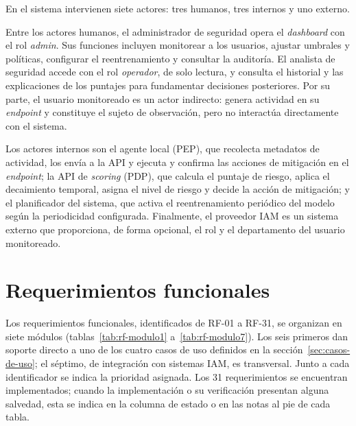 En el sistema intervienen siete actores: tres humanos, tres internos y uno externo.

Entre los actores humanos, el administrador de seguridad opera el \emph{dashboard} con el rol \textit{admin}. Sus funciones incluyen monitorear a los usuarios, ajustar umbrales y políticas, configurar el reentrenamiento y consultar la auditoría. El analista de seguridad accede con el rol \textit{operador}, de solo lectura, y consulta el historial y las explicaciones de los puntajes para fundamentar decisiones posteriores. Por su parte, el usuario monitoreado es un actor indirecto: genera actividad en su \emph{endpoint} y constituye el sujeto de observación, pero no interactúa directamente con el sistema.

Los actores internos son el agente local (PEP), que recolecta metadatos de actividad, los envía a la API y ejecuta y confirma las acciones de mitigación en el \emph{endpoint}; la API de \emph{scoring} (PDP), que calcula el puntaje de riesgo, aplica el decaimiento temporal, asigna el nivel de riesgo y decide la acción de mitigación; y el planificador del sistema, que activa el reentrenamiento periódico del modelo según la periodicidad configurada. Finalmente, el proveedor IAM es un sistema externo que proporciona, de forma opcional, el rol y el departamento del usuario monitoreado.

\section{Requerimientos funcionales}
\label{sec:requerimientos-funcionales}

Los requerimientos funcionales, identificados de RF-01 a RF-31, se organizan en siete módulos (tablas~\ref{tab:rf-modulo1} a~\ref{tab:rf-modulo7}). Los seis primeros dan soporte directo a uno de los cuatro casos de uso definidos en la sección~\ref{sec:casos-de-uso}; el séptimo, de integración con sistemas IAM, es transversal. Junto a cada identificador se indica la prioridad asignada. Los 31 requerimientos se encuentran implementados; cuando la implementación o su verificación presentan alguna salvedad, esta se indica en la columna de estado o en las notas al pie de cada tabla.

